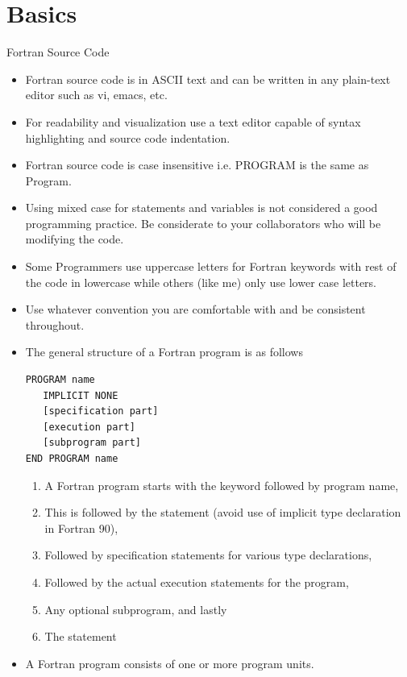 \documentclass[10pt,t]{beamer}
\begin{document}
\section{Basics}
\begin{frame}{Fortran Source Code}
  \begin{itemize}
    \item Fortran source code is in ASCII text and can be written in any plain-text editor such as vi, emacs, etc.
    \item For readability and visualization use a text editor capable of syntax highlighting and source code indentation.
    \item Fortran source code is case insensitive i.e. PROGRAM is the same as Program.
    \item Using mixed case for statements and variables is not considered a good programming practice. Be considerate to your collaborators who will be modifying the code.
    \item Some Programmers use uppercase letters for Fortran keywords with rest of the code in lowercase while others (like me) only use lower case letters.
    \item Use whatever convention you are comfortable with and be consistent throughout.
    \item The general structure of a Fortran program is as follows
      \begin{lstlisting}[language={[90]Fortran}]
PROGRAM name
   IMPLICIT NONE
   [specification part]
   [execution part]
   [subprogram part]
END PROGRAM name
      \end{lstlisting}
      \begin{enumerate}
        \item A Fortran program starts with the keyword  followed by program name,
        \item This is followed by the  statement (avoid use of implicit type declaration in Fortran 90),
        \item Followed by specification statements for various type declarations,
        \item Followed by the actual execution statements for the program,
        \item Any optional subprogram, and lastly
        \item The  statement
      \end{enumerate}
      \framebreak
    \item A Fortran program consists of one or more program units.

\end{itemize}
\end{frame}
\end{document}
